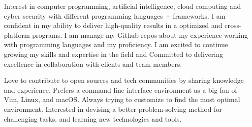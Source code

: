 

\begin{cvparagraph}

Interest in computer programming, artificial intelligence, cloud computing and cyber security with different programming languages + frameworks. I am confident in my ability to deliver high-quality results in a optimized and cross-platform programs. I am manage my Github repos about my experience working with programming languages and my proficiency. I am excited to continue growing my skills and expertise in the field and Committed to delivering excellence in collaboration with clients and team members.

Love to contribute to open sources and tech communities by sharing knowledge and experience. Prefers a command line interface environment as a big fan of Vim, Linux, and macOS. Always trying to customize to find the most optimal environment. Interested in devising a better problem-solving method for challenging tasks, and learning new technologies and tools.
\end{cvparagraph}
